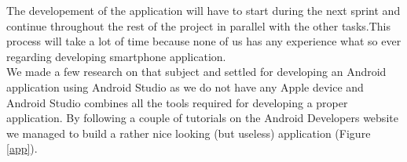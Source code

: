 The developement of the application will have to start during the next sprint and continue throughout the rest of the project in parallel with the other tasks.This process will take a lot of time because none of us has any experience what so ever regarding developing smartphone application.\\
We made a few research on that subject and settled for developing an Android application using Android Studio as we do not have any Apple device and Android Studio combines all the tools required for developing a proper application. By following a couple of tutorials on the Android Developers website we managed to build a rather nice looking (but useless) application (Figure \ref{app}).